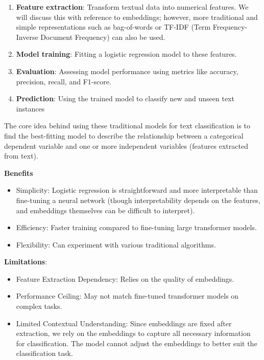 \documentclass[
  letterpaper,
  DIV=11,
  numbers=noendperiod]{scrreprt}
\providecommand{\tightlist}{%
  \setlength{\itemsep}{0pt}\setlength{\parskip}{0pt}}\usepackage{longtable,booktabs,array}
\begin{document}
\begin{enumerate}
\def\labelenumi{\arabic{enumi}.}
\tightlist
\item
  \textbf{Feature extraction}: Transform textual data into numerical
  features. We will discuss this with reference to embeddings; however,
  more traditional and simple representations such as bag-of-words or
  TF-IDF (Term Frequency-Inverse Document Frequency) can also be used.
\item
  \textbf{Model training}: Fitting a logistic regression model to these
  features.
\item
  \textbf{Evaluation}: Assessing model performance using metrics like
  accuracy, precision, recall, and F1-score.
\item
  \textbf{Prediction}: Using the trained model to classify new and
  unseen text instances
\end{enumerate}

The core idea behind using these traditional models for text
classification is to find the best-fitting model to describe the
relationship between a categorical dependent variable and one or more
independent variables (features extracted from text).

\textbf{Benefits}

\begin{itemize}
\tightlist
\item
  Simplicity: Logistic regression is straightforward and more
  interpretable than fine-tuning a neural network (though
  interpretability depends on the features, and embeddings themselves
  can be difficult to interpret).
\item
  Efficiency: Faster training compared to fine-tuning large transformer
  models.
\item
  Flexibility: Can experiment with various traditional algorithms.
\end{itemize}

\textbf{Limitations}:

\begin{itemize}
\tightlist
\item
  Feature Extraction Dependency: Relies on the quality of embeddings.
\item
  Performance Ceiling: May not match fine-tuned transformer models on
  complex tasks.
\item
  Limited Contextual Understanding: Since embeddings are fixed after
  extraction, we rely on the embeddings to capture all necessary
  information for classification. The model cannot adjust the embeddings
  to better suit the classification task.
\end{itemize}
\end{document}
